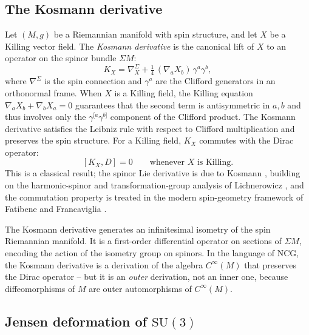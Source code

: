 \documentclass[12pt]{article}
\theoremstyle{definition}
\theoremstyle{remark}
\begin{document}
\subsection{The Kosmann derivative}
\label{subsec:kosmann}

Let $(M, g)$ be a Riemannian manifold with spin structure, and let $X$ be a Killing vector field.  The \emph{Kosmann derivative} \cite{Kosmann1971} is the canonical lift of $X$ to an operator on the spinor bundle $\Sigma M$:
\begin{equation}\label{eq:kosmann}
  K_X = \nabla_X^{\Sigma} + \tfrac{1}{4}\, (\nabla_a X_b)\, \gamma^a \gamma^b,
\end{equation}
where $\nabla^{\Sigma}$ is the spin connection and $\gamma^a$ are the Clifford generators in an orthonormal frame.  When $X$ is a Killing field, the Killing equation $\nabla_a X_b + \nabla_b X_a = 0$ guarantees that the second term is antisymmetric in $a, b$ and thus involves only the $\gamma^{[a}\gamma^{b]}$ component of the Clifford product.  The Kosmann derivative satisfies the Leibniz rule with respect to Clifford multiplication and preserves the spin structure.  For a Killing field, $K_X$ commutes with the Dirac operator:
\begin{equation}\label{eq:kosmanncommutes}
  [K_X, D] = 0 \qquad \text{whenever } X \text{ is Killing}.
\end{equation}
This is a classical result; the spinor Lie derivative is due to Kosmann \cite{Kosmann1971}, building on the harmonic-spinor and transformation-group analysis of Lichnerowicz \cite{Lichnerowicz1963}, and the commutation property is treated in the modern spin-geometry framework of Fatibene and Francaviglia \cite{Fatibene1996}.

The Kosmann derivative generates an infinitesimal isometry of the spin Riemannian manifold.  It is a first-order differential operator on sections of $\Sigma M$, encoding the action of the isometry group on spinors.  In the language of NCG, the Kosmann derivative is a derivation of the algebra $C^\infty(M)$ that preserves the Dirac operator -- but it is an \emph{outer} derivation, not an inner one, because diffeomorphisms of $M$ are outer automorphisms of $C^\infty(M)$.

\subsection{Jensen deformation of \texorpdfstring{$\mathrm{SU}(3)$}{SU(3)}}
\label{subsec:jensen}
\end{document}
